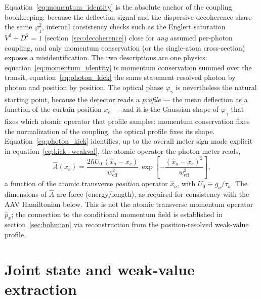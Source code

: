 \documentclass[11pt,a4paper]{article}
\begin{document}
Equation~\eqref{eq:momentum_identity} is the absolute anchor of the coupling bookkeeping: because the deflection signal and the dispersive decoherence share the same $\varphi_1^2$, internal consistency checks such as the Englert saturation $V^2 + D^2 = 1$ (section~\ref{sec:decoherence}) close for \emph{any} assumed per-photon coupling, and only momentum conservation (or the single-atom cross-section) exposes a misidentification. The two descriptions are one physics: equation~\eqref{eq:momentum_identity} is momentum conservation summed over the transit, equation~\eqref{eq:photon_kick} the same statement resolved photon by photon and position by position. The optical phase $\varphi_\gamma$ is nevertheless the natural starting point, because the detector reads a \emph{profile} --- the mean deflection as a function of the curtain position $x_c$ --- and it is the Gaussian shape of $\varphi_\gamma$ that fixes which atomic operator that profile samples: momentum conservation fixes the normalization of the coupling, the optical profile fixes its shape. Equation~\eqref{eq:photon_kick} identifies, up to the overall meter sign made explicit in equation~\eqref{eq:kick_weakval}, the atomic operator the photon meter reads,
\begin{equation}
\hat{A}(x_c) = \frac{2\hbar U_0\,(\hat{x}_a - x_c)}{w_\text{eff}^2}\,\exp\!\left[-\frac{(\hat{x}_a - x_c)^2}{w_\text{eff}^2}\right],
\label{eq:coupling_operator}
\end{equation}
a function of the atomic transverse \emph{position} operator $\hat{x}_a$, with $U_0 \equiv g_a/\tau_a$. The dimensions of $\hat{A}$ are force (energy/length), as required for consistency with the AAV Hamiltonian below. This is not the atomic transverse momentum operator $\hat{p}_x$; the connection to the conditional momentum field is established in section~\ref{sec:bohmian} via reconstruction from the position-resolved weak-value profile.

\section{Joint state and weak-value extraction}
\label{sec:weakval}
\end{document}
